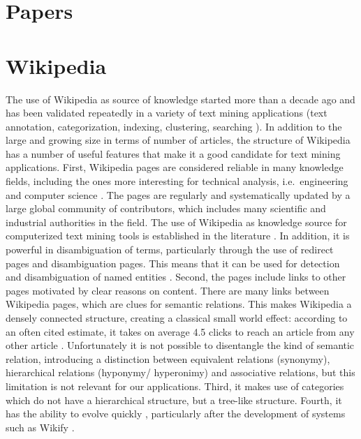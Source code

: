 \documentclass[]{book}
\begin{document}
\section{Papers}\label{sotadocumentspapers}

\section{Wikipedia}\label{sotadocumentswiki}

The use of Wikipedia as source of knowledge started more than a decade
ago and has been validated repeatedly in a variety of text mining
applications (text annotation, categorization, indexing, clustering,
searching \citep{milne2008learning}). In addition to the large and
growing size in terms of number of articles, the structure of Wikipedia
has a number of useful features that make it a good candidate for text
mining applications. First, Wikipedia pages are considered reliable in
many knowledge fields, including the ones more interesting for technical
analysis, i.e.~engineering and computer science \citep{xu2015improving}.
The pages are regularly and systematically updated by a large global
community of contributors, which includes many scientific and industrial
authorities in the field. The use of Wikipedia as knowledge source for
computerized text mining tools is established in the literature
\citep{ferragina2012fast}. In addition, it is powerful in disambiguation
of terms, particularly through the use of redirect pages and
disambiguation pages. This means that it can be used for detection and
disambiguation of named entities \citep{bunescu2006using}. Second, the
pages include links to other pages motivated by clear reasons on
content. There are many links between Wikipedia pages, which are clues
for semantic relations. This makes Wikipedia a densely connected
structure, creating a classical small world effect: according to an
often cited estimate, it takes on average 4.5 clicks to reach an article
from any other article \citep{dolan2008six}. Unfortunately it is not
possible to disentangle the kind of semantic relation, introducing a
distinction between equivalent relations (synonymy), hierarchical
relations (hyponymy/ hyperonimy) and associative relations, but this
limitation is not relevant for our applications. Third, it makes use of
categories which do not have a hierarchical structure, but a tree-like
structure. Fourth, it has the ability to evolve quickly
\citep{lih2004wikipedia}, particularly after the development of systems
such as Wikify \citep{mihalcea2007wikify, cheng2013relational}.
\end{document}

